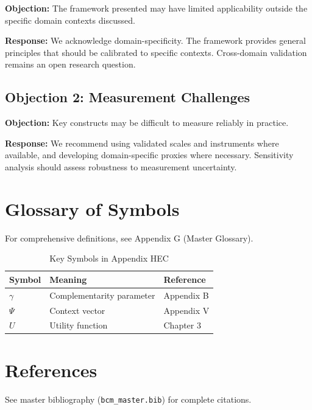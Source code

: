 \textbf{Objection:} The framework presented may have limited applicability
outside the specific domain contexts discussed.

\textbf{Response:} We acknowledge domain-specificity. The framework provides
general principles that should be calibrated to specific contexts. Cross-domain
validation remains an open research question.

\subsection{Objection 2: Measurement Challenges}

\textbf{Objection:} Key constructs may be difficult to measure reliably in
practice.

\textbf{Response:} We recommend using validated scales and instruments where
available, and developing domain-specific proxies where necessary. Sensitivity
analysis should assess robustness to measurement uncertainty.



\section{Glossary of Symbols}
\label{sec:hec-glossary}

For comprehensive definitions, see Appendix G (Master Glossary).

\begin{table}[htbp]
\centering
\caption{Key Symbols in Appendix HEC}
\begin{tabular}{lll}
\toprule
\textbf{Symbol} & \textbf{Meaning} & \textbf{Reference} \\
\midrule
$\gamma$ & Complementarity parameter & Appendix B \\
$\Psi$ & Context vector & Appendix V \\
$U$ & Utility function & Chapter 3 \\
\bottomrule
\end{tabular}
\end{table}


\section{References}
\label{sec:hec-references}

See master bibliography (\texttt{bcm\_master.bib}) for complete citations.

\nocite{bcm_master}

